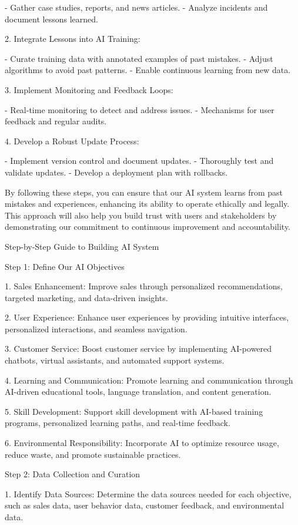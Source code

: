 \documentclass[12pt,letterpaper]{article}
\begin{document}
- Gather case studies, reports, and news articles.
- Analyze incidents and document lessons learned.

2. Integrate Lessons into AI Training:

- Curate training data with annotated examples of past mistakes.
- Adjust algorithms to avoid past patterns.
- Enable continuous learning from new data.

3. Implement Monitoring and Feedback Loops:

- Real-time monitoring to detect and address issues.
- Mechanisms for user feedback and regular audits.

4. Develop a Robust Update Process:

- Implement version control and document updates.
- Thoroughly test and validate updates.
- Develop a deployment plan with rollbacks.

By following these steps, you can ensure that our AI system learns from past mistakes and experiences, enhancing its ability to operate ethically and legally. This approach will also help you build trust with users and stakeholders by demonstrating our commitment to continuous improvement and accountability.

 Step-by-Step Guide to Building AI System

 Step 1: Define Our AI Objectives

1. Sales Enhancement: Improve sales through personalized recommendations, targeted marketing, and data-driven insights.

2. User Experience: Enhance user experiences by providing intuitive interfaces, personalized interactions, and seamless navigation.

3. Customer Service: Boost customer service by implementing AI-powered chatbots, virtual assistants, and automated support systems.

4. Learning and Communication: Promote learning and communication through AI-driven educational tools, language translation, and content generation.

5. Skill Development: Support skill development with AI-based training programs, personalized learning paths, and real-time feedback.

6. Environmental Responsibility: Incorporate AI to optimize resource usage, reduce waste, and promote sustainable practices.

 Step 2: Data Collection and Curation

1. Identify Data Sources: Determine the data sources needed for each objective, such as sales data, user behavior data, customer feedback, and environmental data.
\end{document}
